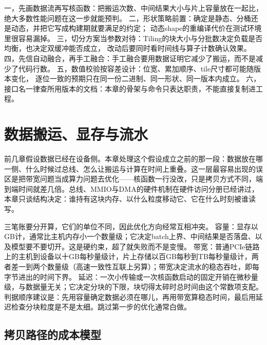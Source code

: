 \documentclass[12pt,a4paper,fontset=fandol]{ctexbook}
\begin{document}
\begin{guideline}[title={把算法迁到NPU的操作顺序}]
一，先画数据流再写核函数：把搬运次数、中间结果大小与片上容量放在一起比，
绝大多数性能问题在这一步就能预判。
二，形状策略前置：确定是静态、分桶还是动态，并把它写成构建期就要满足的约定；
动态shape的重编译代价在测试环境里很容易漏掉。
三，切分方案当参数对待：Tiling的块大小与分批数决定负载是否均衡，也决定双缓冲能否成立，
改动后要同时看时间线与算子计数确认效果。
四，先信自动融合，再手工融合：手工融合要用数据证明它减少了搬运，而不是减少了代码行数。
五，数值校验按容差设计：位宽、累加顺序、tile尺寸都可能随版本变化，
逐位一致的预期只在同一份二进制、同一形状、同一版本内成立。
六，接口名一律查所用版本的文档：本章的骨架与命令只表达职责，不能直接复制进工程。
\end{guideline}
\chapter{数据搬运、显存与流水}

前几章假设数据已经在设备侧。本章处理这个假设成立之前的那一段：数据放在哪一侧、什么时候过总线、怎么让搬运与计算在时间上重叠。这一层最容易出现的误区是把带宽问题当成算力问题去优化——核函数一行没改，只是拷贝方式不同，端到端时间就差几倍。总线、MMIO与DMA的硬件机制在硬件访问分册已经讲过，本章只谈结构决定：谁持有这块内存、以什么粒度移动它、它在什么时刻被谁读写。

\begin{note}[title={容量、带宽、延迟三笔账}]
三笔账要分开算，它们的单位不同，因此优化方向经常互相冲突。
容量：显存以GB计，通常比主机内存小一个数量级；它决定batch上界、中间结果是否落盘、以及模型要不要切开。这是硬约束，超了就失败而不是变慢。
带宽：普通PCIe链路上的主机到设备以十GB每秒量级计，片上存储以百GB每秒到TB每秒量级计，两者差一到两个数量级（高速一致性互联上另算）；带宽决定流水的稳态吞吐，即每字节进出的时间下界。
延迟：一次小传输或一次核函数启动的固定开销在微秒量级，与数据量无关；它决定分块的下限，块切得太碎时总时间由这个常数项支配。
判据顺序建议是：先用容量确定数据必须在哪儿，再用带宽算稳态时间，最后用延迟检查分块粒度是不是太细。跳过第一步的优化通常白做。
\end{note}

\section{拷贝路径的成本模型}
\end{document}
